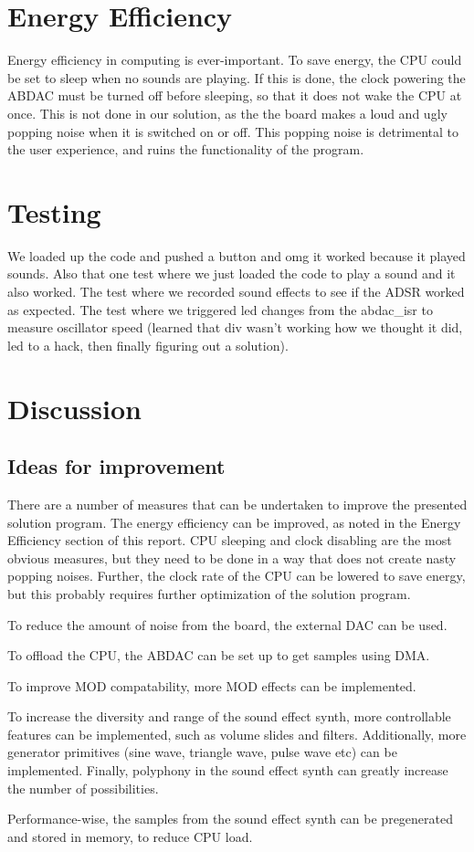 \section{Energy Efficiency}

Energy efficiency in computing is ever-important.
To save energy, the CPU could be set to sleep when no sounds are playing.
If this is done, the clock powering the ABDAC must be turned off before sleeping, so that it does not wake the CPU at once.
This is not done in our solution, as the the board makes a loud and ugly popping noise when it is switched on or off.
This popping noise is detrimental to the user experience, and ruins the functionality of the program.


\section{Testing}
We loaded up the code and pushed a button and omg it worked because it played sounds.
Also that one test where we just loaded the code to play a sound and it also worked.
The test where we recorded sound effects to see if the ADSR worked as expected.
The test where we triggered led changes from the abdac\_isr to measure oscillator speed (learned that div wasn't working how we thought it did, led to a hack, then finally figuring out a solution).


\section{Discussion}



\subsection{Ideas for improvement}

There are a number of measures that can be undertaken to improve the presented solution program.
The energy efficiency can be improved, as noted in the Energy Efficiency section of this report.
CPU sleeping and clock disabling are the most obvious measures, but they need to be done in a way that does not create nasty popping noises. 
Further, the clock rate of the CPU can be lowered to save energy, but this probably requires further optimization of the solution program.

To reduce the amount of noise from the board, the external DAC can be used.

To offload the CPU, the ABDAC can be set up to get samples using DMA.

To improve MOD compatability, more MOD effects can be implemented.

To increase the diversity and range of the sound effect synth, more controllable features can be implemented, such as volume slides and filters.
Additionally, more generator primitives (sine wave, triangle wave, pulse wave etc) can be implemented.
Finally, polyphony in the sound effect synth can greatly increase the number of possibilities.

Performance-wise, the samples from the sound effect synth can be pregenerated and stored in memory, to reduce CPU load.
